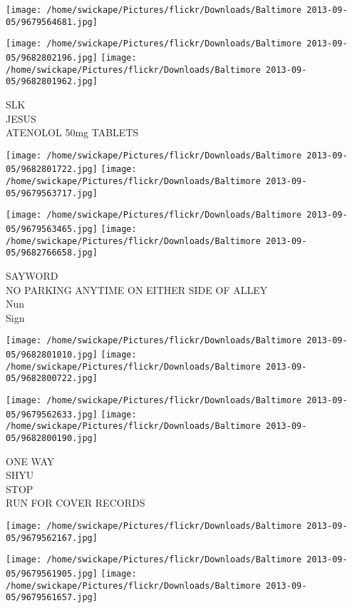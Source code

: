 \documentclass[10pt,letterpaper]{article}
\begin{document}
\texttt{[image: /home/swickape/Pictures/flickr/Downloads/Baltimore 2013-09-05/9679564681.jpg]}

\vspace{0.25in}
\texttt{[image: /home/swickape/Pictures/flickr/Downloads/Baltimore 2013-09-05/9682802196.jpg]}
\texttt{[image: /home/swickape/Pictures/flickr/Downloads/Baltimore 2013-09-05/9682801962.jpg]}

SLK\\
JESUS\\
ATENOLOL 50mg TABLETS
\pagebreak

\texttt{[image: /home/swickape/Pictures/flickr/Downloads/Baltimore 2013-09-05/9682801722.jpg]}
\texttt{[image: /home/swickape/Pictures/flickr/Downloads/Baltimore 2013-09-05/9679563717.jpg]}

\texttt{[image: /home/swickape/Pictures/flickr/Downloads/Baltimore 2013-09-05/9679563465.jpg]}
\texttt{[image: /home/swickape/Pictures/flickr/Downloads/Baltimore 2013-09-05/9682766658.jpg]}

SAYWORD\\
NO PARKING ANYTIME ON EITHER SIDE OF ALLEY\\
Nun\\
Sign
\pagebreak

\texttt{[image: /home/swickape/Pictures/flickr/Downloads/Baltimore 2013-09-05/9682801010.jpg]}
\texttt{[image: /home/swickape/Pictures/flickr/Downloads/Baltimore 2013-09-05/9682800722.jpg]}

\texttt{[image: /home/swickape/Pictures/flickr/Downloads/Baltimore 2013-09-05/9679562633.jpg]}
\texttt{[image: /home/swickape/Pictures/flickr/Downloads/Baltimore 2013-09-05/9682800190.jpg]}

ONE WAY\\
SHYU\\
STOP\\
RUN FOR COVER RECORDS
\pagebreak

\texttt{[image: /home/swickape/Pictures/flickr/Downloads/Baltimore 2013-09-05/9679562167.jpg]}

\vspace{0.25in}
\texttt{[image: /home/swickape/Pictures/flickr/Downloads/Baltimore 2013-09-05/9679561905.jpg]}
\texttt{[image: /home/swickape/Pictures/flickr/Downloads/Baltimore 2013-09-05/9679561657.jpg]}
\end{document}
